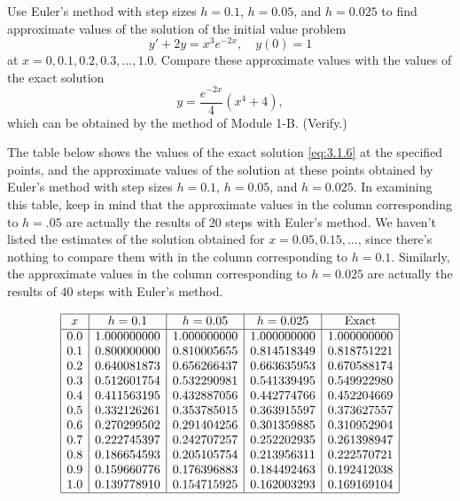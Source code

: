 \documentclass{ximera}
\begin{document}
\begin{example}\label{example:3.1.2}
Use Euler's method with step sizes $h=0.1$, $h=0.05$, and $h=0.025$ to
find approximate values of the solution of the initial value problem
$$
y'+2y=x^3e^{-2x},\quad y(0)=1
$$
at $x=0, 0.1, 0.2, 0.3, \ldots, 1.0$. Compare these approximate
values
with the values of the exact solution
\begin{equation} \label{eq:3.1.6}
y=\frac{e^{-2x}}{4}(x^4+4),
\end{equation}
which can be obtained by the method of Module 1-B. (Verify.)
 
 
 
\begin{explanation}
The table below shows the values of the exact solution
\eqref{eq:3.1.6} at the specified points, and the approximate values of
the solution at these points obtained by Euler's method with step
sizes $h=0.1$, $h=0.05$, and $h=0.025$. In examining this table, keep
in mind that the approximate values in the column corresponding to
$h=.05$ are actually the results of 20 steps with Euler's method. We
haven't listed the estimates of the solution obtained for
$x=0.05, 0.15, \dots $, since there's nothing to compare them with in
the column corresponding to $h=0.1$. Similarly, the approximate values
in the column corresponding to $h=0.025$ are actually the results of
$40$ steps with Euler's method.
 
 
$$
\begin{array}{|c|c|c|c|c|}
\hline
x & h=0.1 & h=0.05 & h=0.025 & \text{Exact}\\ \hline
0.0 & 1.000000000 & 1.000000000 & 1.000000000 & 1.000000000 \\
0.1 & 0.800000000 & 0.810005655 & 0.814518349 & 0.818751221 \\
0.2 & 0.640081873 & 0.656266437 & 0.663635953 & 0.670588174 \\
0.3 & 0.512601754 & 0.532290981 & 0.541339495 & 0.549922980 \\
0.4 & 0.411563195 & 0.432887056 & 0.442774766 & 0.452204669 \\
0.5 & 0.332126261 & 0.353785015 & 0.363915597 & 0.373627557 \\
0.6 & 0.270299502 & 0.291404256 & 0.301359885 & 0.310952904 \\
0.7 & 0.222745397 & 0.242707257 & 0.252202935 & 0.261398947 \\
0.8 & 0.186654593 & 0.205105754 & 0.213956311 & 0.222570721 \\
0.9 & 0.159660776 & 0.176396883 & 0.184492463 & 0.192412038 \\
1.0 & 0.139778910 & 0.154715925 & 0.162003293 & 0.169169104\\
\hline
\end{array}
$$
 

\end{explanation}
\end{example}
\end{document}
